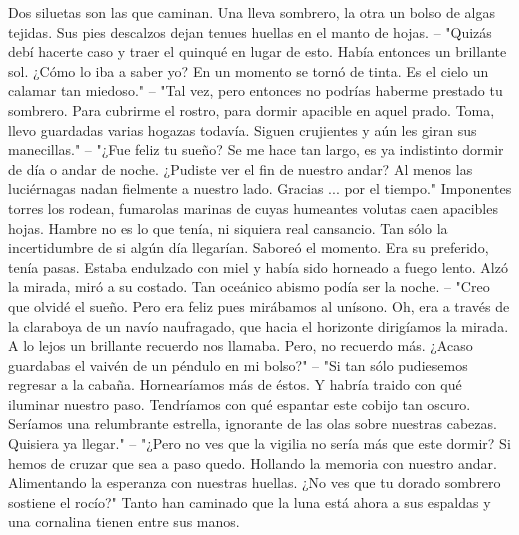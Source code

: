 \markdownRendererInterblockSeparator
{}Dos siluetas son las que caminan. Una lleva sombrero, la otra un bolso de algas tejidas. Sus pies descalzos dejan tenues huellas en el manto de hojas.\markdownRendererInterblockSeparator
{}-- "Quizás debí hacerte caso y traer el quinqué en lugar de esto. Había entonces un brillante sol. ¿Cómo lo iba a saber yo? En un momento se tornó de tinta. Es el cielo un calamar tan miedoso."\markdownRendererInterblockSeparator
{}-- "Tal vez, pero entonces no podrías haberme prestado tu sombrero. Para cubrirme el rostro, para dormir apacible en aquel prado. Toma, llevo guardadas varias hogazas todavía. Siguen crujientes y aún les giran sus manecillas."\markdownRendererInterblockSeparator
{}-- "¿Fue feliz tu sueño? Se me hace tan largo, es ya indistinto dormir de día o andar de noche. ¿Pudiste ver el fin de nuestro andar? Al menos las luciérnagas nadan fielmente a nuestro lado. Gracias ... por el tiempo."\markdownRendererInterblockSeparator
{}Imponentes torres los rodean, fumarolas marinas de cuyas humeantes volutas caen apacibles hojas. Hambre no es lo que tenía, ni siquiera real cansancio. Tan sólo la incertidumbre de si algún día llegarían. Saboreó el momento. Era su preferido, tenía pasas. Estaba endulzado con miel y había sido horneado a fuego lento. Alzó la mirada, miró a su costado. Tan oceánico abismo podía ser la noche.\markdownRendererInterblockSeparator
{}-- "Creo que olvidé el sueño. Pero era feliz pues mirábamos al unísono. Oh, era a través de la claraboya de un navío naufragado, que hacia el horizonte dirigíamos la mirada. A lo lejos un brillante recuerdo nos llamaba. Pero, no recuerdo más. ¿Acaso guardabas el vaivén de un péndulo en mi bolso?"\markdownRendererInterblockSeparator
{}-- "Si tan sólo pudiesemos regresar a la cabaña. Hornearíamos más de éstos. Y habría traido con qué iluminar nuestro paso. Tendríamos con qué espantar este cobijo tan oscuro. Seríamos una relumbrante estrella, ignorante de las olas sobre nuestras cabezas. Quisiera ya llegar."\markdownRendererInterblockSeparator
{}-- "¿Pero no ves que la vigilia no sería más que este dormir? Si hemos de cruzar que sea a paso quedo. Hollando la memoria con nuestro andar. Alimentando la esperanza con nuestras huellas. ¿No ves que tu dorado sombrero sostiene el rocío?"\markdownRendererInterblockSeparator
{}Tanto han caminado que la luna está ahora a sus espaldas y una cornalina tienen entre sus manos.\relax